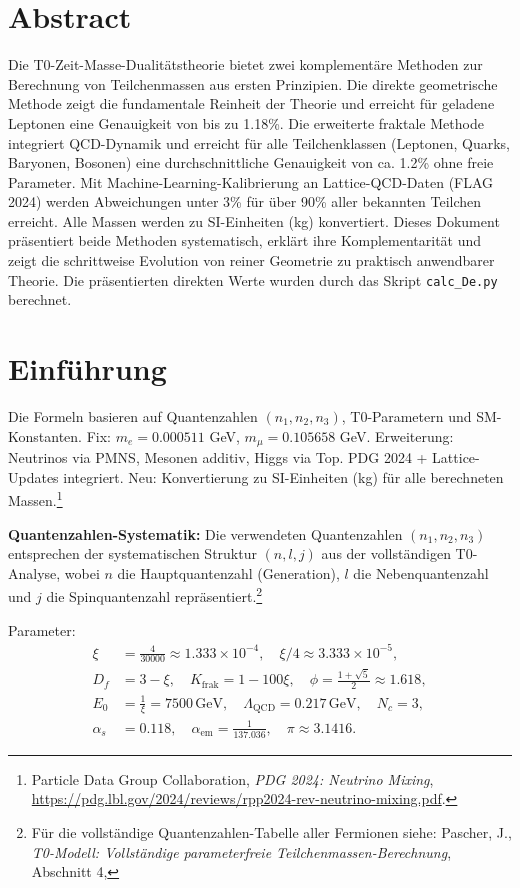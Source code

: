 \section*{Abstract}
		Die T0-Zeit-Masse-Dualitätstheorie bietet zwei komplementäre Methoden zur Berechnung von Teilchenmassen aus ersten Prinzipien. Die direkte geometrische Methode zeigt die fundamentale Reinheit der Theorie und erreicht für geladene Leptonen eine Genauigkeit von bis zu 1.18\%. Die erweiterte fraktale Methode integriert QCD-Dynamik und erreicht für alle Teilchenklassen (Leptonen, Quarks, Baryonen, Bosonen) eine durchschnittliche Genauigkeit von ca. 1.2\% ohne freie Parameter. Mit Machine-Learning-Kalibrierung an Lattice-QCD-Daten (FLAG 2024) werden Abweichungen unter 3\% für über 90\% aller bekannten Teilchen erreicht. Alle Massen werden zu SI-Einheiten (kg) konvertiert. Dieses Dokument präsentiert beide Methoden systematisch, erklärt ihre Komplementarität und zeigt die schrittweise Evolution von reiner Geometrie zu praktisch anwendbarer Theorie. Die präsentierten direkten Werte wurden durch das Skript \texttt{calc\_De.py} berechnet.

	
	
	\section{Einführung}
	\label{sec:einfuehrung}
	
	Die Formeln basieren auf Quantenzahlen $(n_1, n_2, n_3)$, T0-Parametern und SM-Konstanten. Fix: $m_e = 0.000511$ GeV, $m_\mu = 0.105658$ GeV. Erweiterung: Neutrinos via PMNS, Mesonen additiv, Higgs via Top. PDG 2024 + Lattice-Updates integriert. Neu: Konvertierung zu SI-Einheiten (kg) für alle berechneten Massen.\footnote{Particle Data Group Collaboration, \emph{PDG 2024: Neutrino Mixing}, \url{https://pdg.lbl.gov/2024/reviews/rpp2024-rev-neutrino-mixing.pdf}.}
	
	\textbf{Quantenzahlen-Systematik:} Die verwendeten Quantenzahlen $(n_1, n_2, n_3)$ entsprechen der systematischen Struktur $(n, l, j)$ aus der vollständigen T0-Analyse, wobei $n$ die Hauptquantenzahl (Generation), $l$ die Nebenquantenzahl und $j$ die Spinquantenzahl repräsentiert.\footnote{Für die vollständige Quantenzahlen-Tabelle aller Fermionen siehe: Pascher, J., \emph{T0-Modell: Vollständige parameterfreie Teilchenmassen-Berechnung}, Abschnitt 4, }
	
	Parameter:
	\begin{align}
		\xi &= \frac{4}{30000} \approx 1.333 \times 10^{-4}, \quad \xi/4 \approx 3.333 \times 10^{-5}, \nonumber \\
		D_f &= 3 - \xi, \quad K_{\text{frak}} = 1 - 100\xi, \quad \phi = \frac{1 + \sqrt{5}}{2} \approx 1.618, \nonumber \\
		E_0 &= \frac{1}{\xi} = 7500 \, \text{GeV}, \quad \Lambda_{\text{QCD}} = 0.217 \, \text{GeV}, \quad N_c = 3, \nonumber \\
		\alpha_s &= 0.118, \quad \alpha_{\text{em}} = \frac{1}{137.036}, \quad \pi \approx 3.1416.
	\end{align}
	
